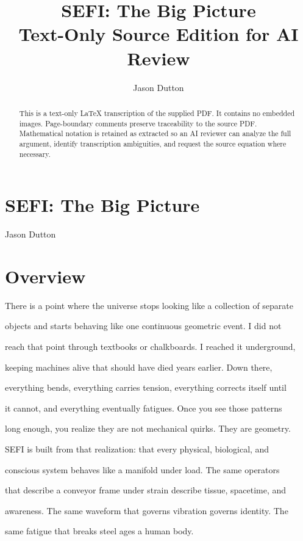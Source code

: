\documentclass[10pt]{article}
\title{SEFI: The Big Picture\\\large Text-Only Source Edition for AI Review}
\author{Jason Dutton}
\date{}
\begin{document}
\maketitle
\begin{abstract}
This is a text-only LaTeX transcription of the supplied PDF. It contains no embedded images. Page-boundary comments preserve traceability to the source PDF. Mathematical notation is retained as extracted so an AI reviewer can analyze the full argument, identify transcription ambiguities, and request the source equation where necessary.
\end{abstract}
\tableofcontents
\clearpage

\section*{SEFI: The Big Picture}
Jason Dutton

\section*{Overview}
There is a point where the universe stops looking like a collection of separate

objects and starts behaving like one continuous geometric event. I did not

reach that point through textbooks or chalkboards. I reached it underground,

keeping machines alive that should have died years earlier. Down there,

everything bends, everything carries tension, everything corrects itself until

it cannot, and everything eventually fatigues. Once you see those patterns

long enough, you realize they are not mechanical quirks. They are geometry.

SEFI is built from that realization: that every physical, biological, and

conscious system behaves like a manifold under load. The same operators

that describe a conveyor frame under strain describe tissue, spacetime, and

awareness. The same waveform that governs vibration governs identity. The

same fatigue that breaks steel ages a human body.
\end{document}
